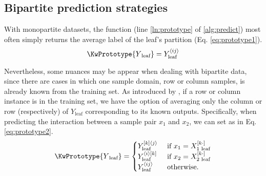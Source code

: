 \documentclass[conference]{IEEEtran}
\newcommand{\el}[1]{^{[#1]}}
\newcommand{\mel}[1]{^{\langle #1 \rangle}}
\newcommand{\angled}[1]{\langle #1 \rangle}
\newcommand{\avg}[1]{\left\langle#1\right\rangle}
\newcommand{\savg}[1]{\langle#1\rangle}
\begin{document}
%
%
%


\subsection{Bipartite prediction strategies}

With monopartite datasets, the \KwPrototype function (line \ref{ln:prototype} of \ref{alg:predict}) most often simply returns the average label of the leaf's partition (Eq. \ref{eq:prototype1}).
\begin{equation}
    \KwPrototype{Y\textsubscript{leaf}}=Y_\text{leaf}\mel{ij}
    \label{eq:prototype1}
\end{equation}

Nevertheless, some nuances may be appear when dealing with bipartite data, since there are cases in which one sample domain, row or column samples, is already known from the training set. As introduced by \cite{Pliakos_2018}, if a row or column instance is in the training set, we have the option of averaging only the column or row (respectively) of $Y_\text{leaf}$ corresponding to its known outputs. Specifically, when predicting the interaction between a sample pair $x_1$ and $x_2$, we can set \KwPrototype as in Eq. \ref{eq:prototype2}.
\begin{equation}
    \KwPrototype{Y\textsubscript{leaf}} =
    \begin{cases}
        Y_\text{leaf}^{[k]\angled{j}} & \text{ if } x_1 = X_{1\text{ leaf}}\el{k\cdot}\\
        Y_\text{leaf}^{\angled{i}[k]} & \text{ if } x_2 = X_{2\text{ leaf}}\el{k\cdot}\\
        Y_\text{leaf}\mel{ij} & \text{ otherwise.}
    \end{cases}
    \label{eq:prototype2}
\end{equation}
\end{document}

